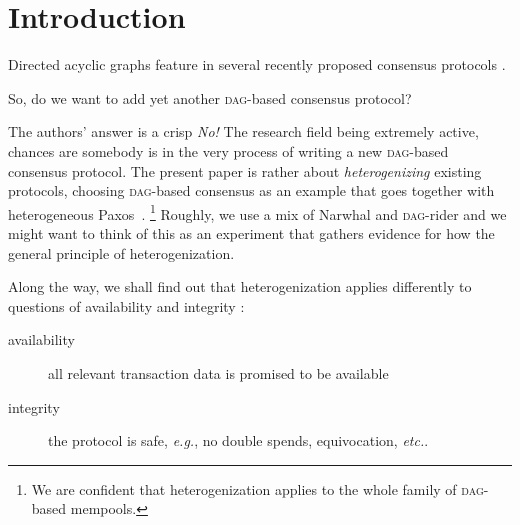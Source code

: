 \documentclass[%
dvipsnames
]{article}
\theoremstyle{definition}
\newcommand{\Dag}[1][]{\textsc{dag}#1\xspace}
\newcommand{\eg}[1][, ]{\emph{e.g.}#1}
\newcommand{\etc}[1][ ]{\emph{etc.}\xspace}
\renewcommand{\todo}[2][]{}
\begin{document}
\tableofcontents

%

\section{Introduction}
Directed acyclic graphs feature in %
several recently proposed consensus protocols
\cite{NT,DagRider,Bullshark}.\xspace%
\todo{→isaac?: 
  which ones should I add here?
} 
So, do we want to add yet another \Dag-based consensus protocol?

The authors' answer is a crisp \emph{No!} %
The research field being extremely active,
chances are somebody is in the very process of writing a new \Dag-based
consensus protocol.
The present paper is rather about \emph{heterogenizing} existing protocols, %
choosing \Dag-based consensus as an example that %
goes together with heterogeneous Paxos~\cite{opodis20HPaxos}.\xspace%
\footnote{%
  We are confident that heterogenization applies to %
  the whole family of \Dag-based mempools. %
}
Roughly, %
we use a mix of Narwhal and \Dag-rider and we might want to think of this 
as an experiment that gathers evidence for how the general principle of
heterogenization.

Along the way,
we shall find out that heterogenization applies differently to questions of availability and integrity \cite{charlotte}:
\begin{description}
\item[availability] all relevant transaction data is promised to be available
\item[integrity] the protocol is safe, \eg no double spends, equivocation,  \etc. 
\end{description}

\todo[inline,size=normalsize]{main contribs:\\[\baselineskip]
  \begin{minipage}{1.0\linewidth}
    - general heterogenization principle ...\\
    - ... by virtue of example: Narwhal-\Dag-rider\\
    - [implementation details] \\
    - discussion: alternative to cross-chain bridges (between very different chains ?)
  \end{minipage}\\[\baselineskip]
}
\end{document}
